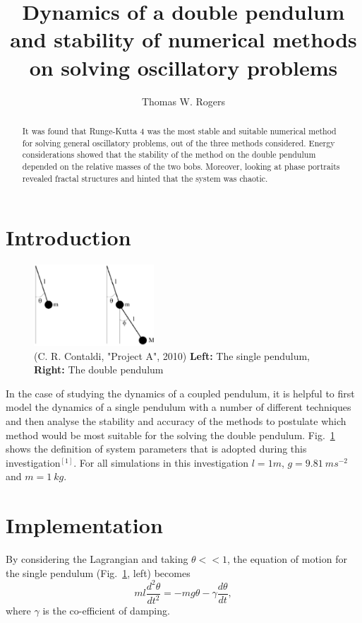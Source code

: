 \documentclass[10pt,a4paper]{article}
\begin{document}
\title{\bfseries \LARGE Dynamics of a double pendulum and stability of numerical methods on solving oscillatory problems}
\author{Thomas W. Rogers}
\maketitle
\begin{abstract}
It was found that Runge-Kutta 4 was the most stable and suitable numerical method for solving general oscillatory problems, out of the three methods considered. Energy considerations showed that the stability of the method on the double pendulum depended on the relative masses of the two bobs. Moreover, looking at phase portraits revealed fractal structures and hinted that the system was chaotic. 
\end{abstract}
\section{Introduction}
\begin{figure}[h!]
\begin{center}
\includegraphics[width =0.4\textwidth]{diagram.eps}
\caption{(C. R. Contaldi, "Project A", 2010) \textbf{Left: }The single pendulum, \textbf{Right: }The double pendulum}
\label{fig:Setup}
\end{center}
\end{figure}
In the case of studying the dynamics of a coupled pendulum, it is helpful to first model the dynamics of a single pendulum with a number of different techniques and then analyse the stability and accuracy of the methods to postulate which method would be most suitable for the solving the double pendulum. Fig.~\ref{fig:Setup} shows the definition of system parameters that is adopted during this investigation$^{[1]}$. For all simulations in this investigation $l=1 m$, $g=9.81\:ms^{-2}$ and $m=1\:kg$.

\section{Implementation}
By considering the Lagrangian and taking $\theta << 1$, the equation of motion for the single pendulum (Fig.~\ref{fig:Setup}, left) becomes
\begin{equation}
ml\frac{d^2\theta}{dt^2} = -mg\theta - \gamma \frac{d\theta}{dt},
\end{equation}
where $\gamma$ is the co-efficient of damping.
\end{document}
